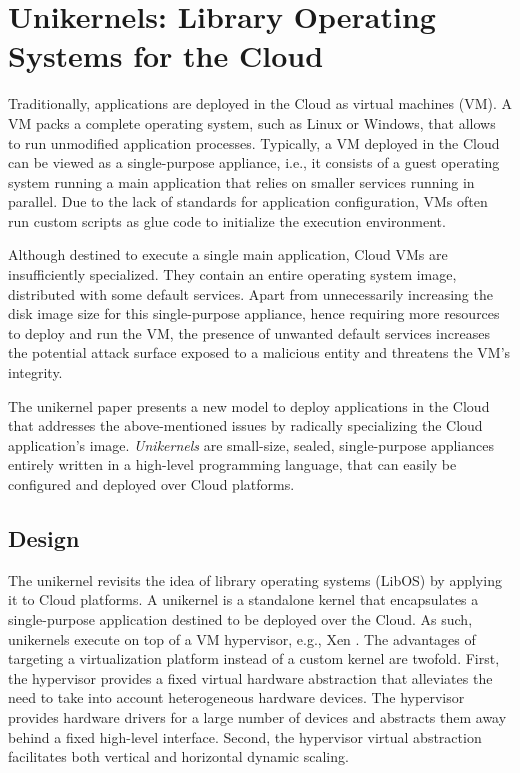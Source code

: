 \section{Unikernels: Library Operating Systems for the Cloud}
Traditionally, applications are deployed in the Cloud as virtual machines (VM).
A VM packs a complete operating system, such as Linux or Windows, that allows to run unmodified application processes.
Typically, a VM deployed in the Cloud can be viewed as a single-purpose appliance, i.e., it consists of a guest operating system running a main application that relies on smaller services running in parallel.
Due to the lack of standards for application configuration, VMs often run custom scripts as glue code to initialize the execution environment.

Although destined to execute a single main application, Cloud VMs are insufficiently specialized.
They contain an entire operating system image, distributed with some default services.
Apart from unnecessarily increasing the disk image size for this single-purpose appliance, hence requiring more resources to deploy and run the VM, the presence of unwanted default services increases the potential attack surface exposed to a malicious entity and threatens the VM's integrity.

The unikernel paper \cite{DBLP:conf/asplos/MadhavapeddyMRSSGSHC13} presents a new model to deploy applications in the Cloud that addresses the above-mentioned issues by radically specializing the Cloud application's image.
\emph{Unikernels} are small-size, sealed, single-purpose appliances entirely written in a high-level programming language, that can easily be configured and deployed over Cloud platforms.

\subsection{Design}
The unikernel revisits the idea of library operating systems (LibOS) by applying it to Cloud platforms.
A unikernel is a standalone kernel that encapsulates a single-purpose application destined to be deployed over the Cloud.
As such, unikernels execute on top of a VM hypervisor, e.g., Xen \cite{DBLP:conf/sosp/BarhamDFHHHN03}.
The advantages of targeting a virtualization platform instead of a custom kernel are twofold.
First, the hypervisor provides a fixed virtual hardware abstraction that alleviates the need to take into account heterogeneous hardware devices.
The hypervisor provides hardware drivers for a large number of devices and abstracts them away behind a fixed high-level interface.
Second, the hypervisor virtual abstraction facilitates both vertical and horizontal dynamic scaling.

